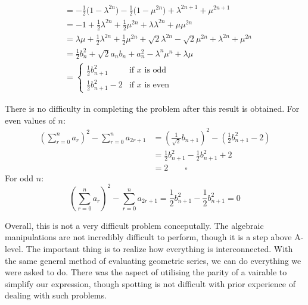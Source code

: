 \documentclass[12pt]{article}
\begin{document}
\begin{align*}
                            & = -\frac{1}{2}\bigg(1 - \lambda^{2n}\bigg) - \frac{1}{2}\bigg(1 - \mu^{2n}\bigg) + \lambda^{2n+1} + \mu^{2n+1}                                                                                     \\
                            & = -1 + \frac{1}{2} \lambda^{2n} + \frac{1}{2} \mu^{2n} + \lambda\lambda^{2n} + \mu\mu^{2n}                                                                                                         \\
                            & = \lambda\mu + \frac{1}{2} \lambda^{2n} + \frac{1}{2} \mu^{2n} + \sqrt{2}\lambda^{2n} - \sqrt{2}\mu^{2n} + \lambda^{2n} + \mu^{2n}                                                                 \\
                            & = \frac{1}{2} b^2_n + \sqrt{2} a_n b_n + a^2_n - \lambda^n\mu^n + \lambda\mu                                                                                                                       \\
                            & =
    \begin{cases}
        \frac{1}{2} b^2_{n+1}    & \text{if } x \text{ is odd}  \\
        \frac{1}{2} b^2_{n+1} -2 & \text{if } x \text{ is even}
    \end{cases}
\end{align*}

There is no difficulty in completing the problem after this result is obtained.
For even values of $n$:
\begin{align*}
    \left(\sum_{r=0}^{n} a_r \right)^2 - \sum_{r=0}^{n} a_{2r+1} & = \left(\frac{1}{\sqrt{2}} b_{n+1}\right)^2 - \left(\frac{1}{2} b^2_{n+1} - 2\right) \\
                                                                 & = \frac{1}{2} b^2_{n+1} - \frac{1}{2} b^2_{n+1} + 2                                  \\
                                                                 & = 2 \qquad \square
\end{align*}
For odd $n$:
\begin{equation*}
    \left(\sum_{r=0}^{n} a_r \right)^2 - \sum_{r=0}^{n} a_{2r+1}  = \frac{1}{2} b^2_{n+1} - \frac{1}{2} b^2_{n+1} = 0
\end{equation*}

Overall, this is not a very difficult problem conceputally.
The algebraic manipulations are not incredibly difficult to perform, though it is a step above A-level.
The important thing is to realize how everything is interconnected.
With the same general method of evaluating geometric series, we can do everything we were asked to do.
There was the aspect of utilising the parity of a vairable to simplify our expression, though spotting is not difficult with prior experience of dealing with such problems.
\end{document}
